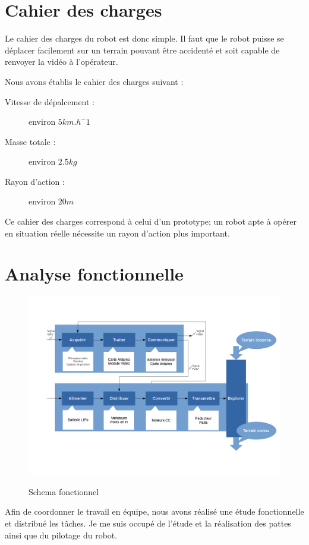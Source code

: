 \documentclass[12pt,french,a4paper]{article}
\begin{document}
\section{Cahier des charges}

Le cahier des charges du robot est donc simple. Il faut que le robot puisse se déplacer facilement sur un terrain pouvant être accidenté et soit capable de renvoyer la vidéo à l'opérateur.

Nous avons établis le cahier des charges suivant : 
\begin{description}
\item[Vitesse de dépalcement :]{environ $ 5 km.h^-1$ }
\item[Masse totale :]{environ $ 2.5 kg$}
\item[Rayon d'action :]{environ $ 20 m$}
\end{description}

Ce cahier des charges correspond à celui d'un prototype; un robot apte à opérer en situation réelle nécessite un rayon d'action plus important.

\section{Analyse fonctionnelle}

\begin{figure}[h!]
	\centering
	\includegraphics[width=\textwidth]{images/SchemaFonctionnel.png}
	\label{fig:Schema_fonctionnel}
	\caption[schema fonctionnel]{ Schema fonctionnel}
\end{figure}

Afin de coordonner le travail en équipe, nous avons réalisé une étude fonctionnelle et distribué les tâches. Je me suis occupé de l'étude et la réalisation des pattes ainsi que du pilotage du robot.
\end{document}
